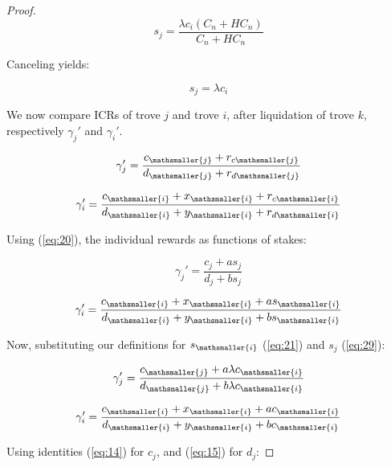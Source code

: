 \documentclass[reqno]{article}
\begin{document}
\begin{proof}
\begin{equation} 
    s_j=\frac{\lambda c_i(C_n+HC_n)}{C_n+HC_n}
\end{equation}

\bigskip
Canceling yields:

\begin{equation} \label{eq:29}
    s_j=\lambda c_i
\end{equation}

\bigskip
We now compare ICRs of trove $j$ and trove $i$, after liquidation of trove $k$, respectively $\gamma_{j}'$ and $\gamma_{i}'$.

\begin{equation} 
    \gamma_{j}'=\frac{c_\mathsmaller{j}+r_{c\mathsmaller{j}}}{d_\mathsmaller{j}+r_{d\mathsmaller{j}}}
\end{equation}

\begin{equation} 
    \gamma_{i}'=\frac{c_\mathsmaller{i}+x_\mathsmaller{i}+r_{c\mathsmaller{i}}}{d_\mathsmaller{i}+y_\mathsmaller{i}+r_{d\mathsmaller{i}}}
\end{equation}

\bigskip
Using (\ref{eq:20}), the individual rewards as functions of stakes:

\begin{equation} 
    \gamma_{j}'=\frac{c_j+as_j}{d_j+bs_j}
\end{equation}

\begin{equation} 
    \gamma_{i}'=\frac{c_\mathsmaller{i}+x_\mathsmaller{i}+as_\mathsmaller{i}}{d_\mathsmaller{i}+y_\mathsmaller{i}+bs_\mathsmaller{i}}
\end{equation}

\bigskip
Now, substituting our definitions for $s_\mathsmaller{i}$ (\ref{eq:21}) and $s_j$ (\ref{eq:29}):

\begin{equation} 
    \gamma_{j}'=\frac{c_\mathsmaller{j}+a\lambda c_\mathsmaller{i}}{d_\mathsmaller{j}+b\lambda c_\mathsmaller{i}}
\end{equation}

\begin{equation} 
    \gamma_{i}'=\frac{c_\mathsmaller{i}+x_\mathsmaller{i}+ac_\mathsmaller{i}}{d_\mathsmaller{i}+y_\mathsmaller{i}+bc_\mathsmaller{i}}
\end{equation}

\bigskip
Using identities (\ref{eq:14}) for $c_j$, and (\ref{eq:15}) for $d_j$:


\end{proof}
\end{document}
